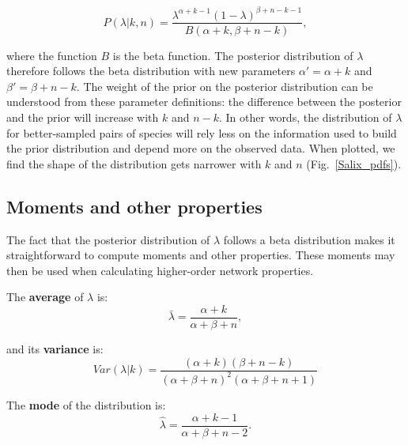 \documentclass[12pt]{article}
\begin{document}
\begin{spacing}{2.0}
      \begin{equation}
        P(\lambda|k,n) = \frac{\lambda^{\alpha+k-1}(1-\lambda)^{\beta+n-k-1}}{B(\alpha+k,\beta+n-k)} , \label{posterior}
      \end{equation}

      
      \noindent where the function $B$ is the beta function. The posterior distribution of $\lambda$ therefore follows the beta distribution with new parameters $\alpha'= \alpha+k$ and $\beta'=\beta+n-k$. The weight of the prior on the posterior distribution can be understood from these parameter definitions: the difference between the posterior and the prior will increase with $k$ and $n-k$. In other words, the distribution of $\lambda$ for better-sampled pairs of species will rely less on the information used to build the prior distribution and depend more on the observed data.
      When plotted, we find the shape of the distribution gets narrower with $k$ and $n$ (Fig.~\ref{Salix_pdfs}). 



    \subsection*{Moments and other properties}

      The fact that the posterior distribution of $\lambda$ follows a beta distribution makes it straightforward to compute moments and other properties. These moments may then be used when calculating higher-order network properties.

      The \textbf{average} of $\lambda$ is: 
          \begin{equation}
            \bar{\lambda} = \frac{\alpha+k}{\alpha+\beta+n} ,
            \label{mean}
          \end{equation}

        and its \textbf{variance} is:  
          \begin{equation}
            Var(\lambda|k) = \frac{(\alpha + k)(\beta + n - k)}{(\alpha + \beta + n)^{2}(\alpha + \beta + n +1)}
            \label{variance}
          \end{equation}

        The \textbf{mode} of the distribution is:
          \begin{equation}
            \hat{\lambda} = \frac{\alpha + k - 1}{\alpha + \beta + n - 2} .
            \label{mode}
          \end{equation}


\end{spacing}
\end{document}
